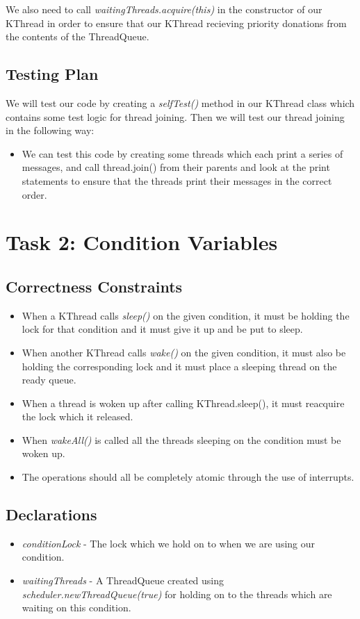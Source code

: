 \documentclass{article}
\begin{document}
We also need to call \textit{waitingThreads.acquire(this)} in the constructor of our KThread in order to ensure
that our KThread recieving priority donations from the contents of the ThreadQueue.

\subsection*{Testing Plan}
We will test our code by creating a \textit{selfTest()} method in our KThread class which contains some test logic
for thread joining. Then we will test our thread joining in the following way:
\begin{itemize}
\item We can test this code by creating some threads which each print a series of messages, and call thread.join() from their
parents and look at the print statements to ensure that the threads print their messages in the correct order.
\end{itemize}

\section*{Task 2: Condition Variables}

\subsection*{Correctness Constraints}
\begin{itemize}
\item When a KThread calls \textit{sleep()} on the given condition, it must be holding the lock for that condition
and it must give it up and be put to sleep.
\item When another KThread calls \textit{wake()} on the given condition, it must also be holding the corresponding
lock and it must place a sleeping thread on the ready queue.
\item When a thread is woken up after calling KThread.sleep(), it must reacquire the lock which it released.
\item When \textit{wakeAll()} is called all the threads sleeping on the condition must be woken up.
\item The operations should all be completely atomic through the use of interrupts.
\end{itemize}

\subsection*{Declarations}
\begin{itemize}
\item \textit{conditionLock} - The lock which we hold on to when we are using our condition.
\item \textit{waitingThreads} - A ThreadQueue created using \textit{scheduler.newThreadQueue(true)} for holding on
to the threads which are waiting on this condition.
\end{itemize}
\end{document}
